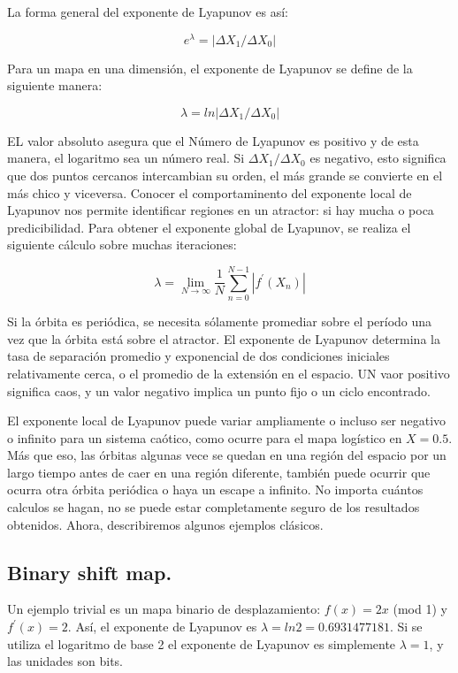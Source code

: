 \documentclass[prodmode,acmtap]{acmlarge}
\begin{document}
La forma general del exponente de Lyapunov es así:

\begin{equation}
e^{\lambda}= |\Delta X_{1} / \Delta X_{0} |
\end{equation}

Para un mapa en una dimensión, el exponente de Lyapunov se define de la siguiente manera:

\begin{equation}
\lambda = ln|\Delta X_{1} / \Delta X_{0} |
\end{equation}

EL valor absoluto asegura que el Número de Lyapunov es positivo y de esta manera, el logaritmo sea un número real.  Si $\Delta X_{1} / \Delta X_{0} $ es negativo, esto significa que dos puntos cercanos intercambian su orden, el más grande se convierte en el más chico y viceversa. Conocer el comportaminento del exponente local de Lyapunov nos permite identificar regiones en un atractor: si hay mucha o poca predicibilidad. Para obtener el exponente global de Lyapunov, se realiza el siguiente cálculo sobre  muchas iteraciones:

\begin{equation}
\lambda = \lim_{N \rightarrow \infty} \frac{1}{N} \sum_{n=0}^{N-1}|f^{'}(X_{n})|
\end{equation}

Si la órbita es periódica, se necesita sólamente promediar sobre el período una vez que la órbita está sobre el atractor.  El exponente de Lyapunov determina  la tasa de separación promedio y exponencial de dos condiciones iniciales relativamente cerca, o el promedio de la extensión en el espacio. UN vaor positivo significa caos, y un valor negativo implica un punto fijo o un ciclo encontrado.

El exponente local de Lyapunov puede variar ampliamente o incluso ser negativo o infinito para un sistema caótico, como ocurre para el mapa logístico en $X=0.5$.  Más que eso, las órbitas algunas vece se quedan en una región del espacio por  un largo tiempo antes de caer en una región diferente, también puede ocurrir que ocurra otra órbita periódica o haya un escape a infinito.
No importa cuántos calculos se hagan, no se puede estar completamente seguro de los resultados obtenidos. Ahora, describiremos algunos ejemplos clásicos.

\subsection{Binary shift map.}
Un ejemplo trivial es un mapa binario de desplazamiento: $f(x)= 2x$ (mod 1) y $f^{'}(x)=2$. Así, el exponente de Lyapunov es $\lambda = ln2 = 0.6931477181$. Si se utiliza el logaritmo de base 2 el exponente de Lyapunov es simplemente $\lambda =1$, y las unidades son bits.
\end{document}
